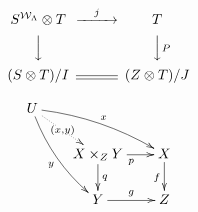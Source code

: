 \documentclass[10pt]{book}
\begin{document}
\begin{mdSnippets}
\begin{mdDisplaySnippet}
\end{mdDisplaySnippet}
\begin{mdDisplaySnippet}[b08537d83682298cd52cf26af41c99da]%
\begin{mdDiv}[class={math,math-display},color={},math-needpdf={}]%
\[%
\begin{CD}
S^{{\mathcal{W}}_\Lambda}\otimes T @>j>> T\\
@VVV @VV{P}V\\
(S\otimes T)/I @= (Z \otimes T)/J
\end{CD}\]%
\end{mdDiv}%

\end{mdDisplaySnippet}
\begin{mdDisplaySnippet}[d10e8eb990fe5cd7257fd28b4d3b7d75]%
\begin{mdDiv}[class={math,math-display},color={},math-needpdf={}]%
\[%
\xymatrix @-0.5em{
U \ar@/_/[ddr]_y \ar@/^/[drr]^x
\ar@{.>}[dr]|-{(x,y)} \\
& X \times_Z Y \ar[d]^q \ar[r]_p
& X \ar[d]_f \\
& Y \ar[r]^g & Z }\]%
\end{mdDiv}%

\end{mdDisplaySnippet}
\newcommand{\infer}[3]{#1 \vdash #2\,:#3}


\end{mdSnippets}
\end{document}

